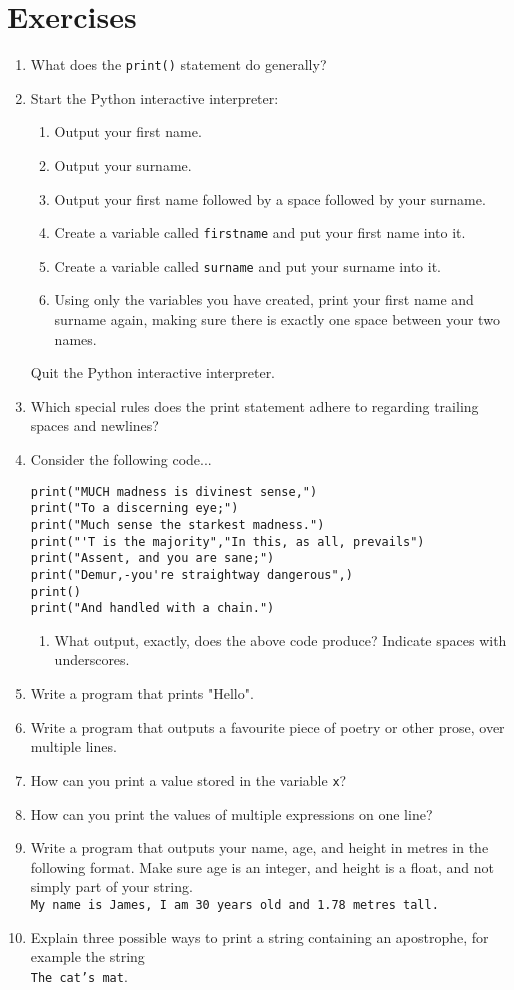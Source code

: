 \section{Exercises}
\begin{enumerate}
	\item What does the \texttt{print()} statement do generally?
	\item Start the Python interactive interpreter:     
\begin{enumerate}
	\item Output your first name.
	\item Output your surname.
	\item Output your first name followed by a space followed by         your surname.
	\item Create a variable called \texttt{firstname} and put your first         name into it.
	\item Create a variable called \texttt{surname} and put your surname         into it.
	\item Using only the variables you have created, print your         first name and surname again, making sure there is exactly         one space between your two names.
\end{enumerate}     Quit the Python interactive interpreter.
	\item Which special rules does the print statement adhere to regarding     trailing spaces and newlines?
    \item Consider the following code...
\begin{lstlisting}
print("MUCH madness is divinest sense,")
print("To a discerning eye;")
print("Much sense the starkest madness.")
print("'T is the majority","In this, as all, prevails")
print("Assent, and you are sane;")
print("Demur,-you're straightway dangerous",)
print()
print("And handled with a chain.")\end{lstlisting}
\begin{enumerate}
	\item What output, exactly, does the above code produce? Indicate     spaces with underscores.
\end{enumerate}
\item Write a program that prints "Hello".
\item Write a program that outputs a favourite piece of poetry or other     prose, over multiple lines.
\item How can you print a value stored in the variable \texttt{x}?
\item How can you print the values of multiple expressions on one line?
\item Write a program that outputs your name, age, and height in     metres in the following format. Make sure age is an integer, and     height is a float, and not simply part of your string.
\\
\texttt{My name is James, I am 30 years old and 1.78 metres       tall.}
\item Explain three possible ways to print a string containing an     apostrophe, for example the string
\\
\texttt{The cat's       mat}.
\end{enumerate}   

